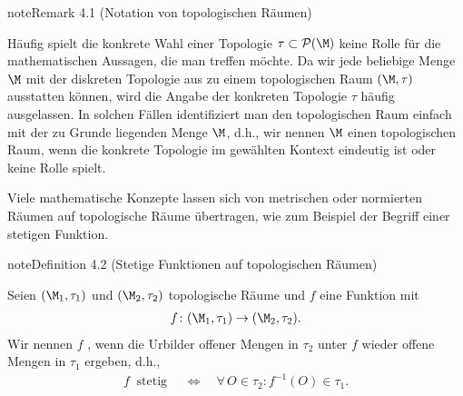 \documentclass[letterpaper,10pt,german]{jupyterBook}
\begin{document}
\label{manifolds/manifolds_prelim:remark-2}
\begin{sphinxadmonition}{note}{Remark 4.1 (Notation von topologischen Räumen)}



\sphinxAtStartPar
Häufig spielt die konkrete Wahl einer Topologie \(\tau \subset \mathcal{P}(\M)\) keine Rolle für die mathematischen Aussagen, die man treffen möchte.
Da wir jede beliebige Menge \(\M\) mit der diskreten Topologie aus {\hyperref[\detokenize{manifolds/manifolds_prelim:ex:diskreteTopologie}]{}} zu einem topologischen Raum \((\M, \tau)\) ausstatten können, wird die Angabe der konkreten Topologie \(\tau\) häufig ausgelassen.
In solchen Fällen identifiziert man den topologischen Raum einfach mit der zu Grunde liegenden Menge \(\M\), d.h., wir nennen \(\M\) einen topologischen Raum, wenn die konkrete Topologie im gewählten Kontext eindeutig ist oder keine Rolle spielt.
\end{sphinxadmonition}

\sphinxAtStartPar
Viele mathematische Konzepte lassen sich von metrischen oder normierten Räumen auf topologische Räume übertragen, wie zum Beispiel der Begriff einer stetigen Funktion.
\label{manifolds/manifolds_prelim:def:stetigkeitTopologie}
\begin{sphinxadmonition}{note}{Definition 4.2 (Stetige Funktionen auf topologischen Räumen)}



\sphinxAtStartPar
Seien \((\M_1, \tau_1)\) und \((\M_2, \tau_2)\) topologische Räume und \(f\) eine Funktion mit
\begin{equation*}
\begin{split}f \colon (\M_1, \tau_1) \rightarrow (\M_2, \tau_2).\end{split}
\end{equation*}
\sphinxAtStartPar
Wir nennen \(f\) , wenn die Urbilder offener Mengen in \(\tau_2\) unter \(f\) wieder offene Mengen in \(\tau_1\) ergeben, d.h.,
\begin{equation*}
\begin{split}f \ \text{ stetig } \quad \Leftrightarrow \quad \forall \, O \in \tau_2 : f^{-1}(O) \in \tau_1.\end{split}
\end{equation*}\end{sphinxadmonition}
\end{document}
